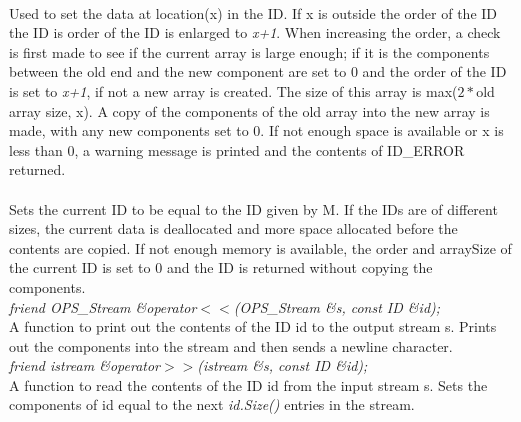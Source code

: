  \\
Used to set the data at location(\p x) in the ID. If \p x is outside
the order of the ID the ID is order of the ID is enlarged to {\em
x+1}. When increasing the order, a check is first made to see if the
current array is large enough; if it is the components between the old
end and the new component are set to $0$ and the order of the ID is set
to {\em x+1}, if not a new array is created. The size of this array is
max($2*$old array size, x). A copy of the components of the old array
into the new array is made, with any new components set to $0$. If not
enough space is available or \p x is less than $0$, a warning
message is printed and the contents of ID\_ERROR returned. \\


\\
Sets the current ID to be equal to the ID given by \p M. If the
IDs are of different sizes, the current data is deallocated and
more space allocated before the contents are copied. If not enough
memory is available, the order and \p arraySize of the current ID
is set to $0$ and the ID is returned without copying the components. \\


{\em friend OPS_Stream \&operator$<<$(OPS_Stream \&s, const ID \&id);} \\
A function to print out the contents of the ID \p id to the output stream
\p s. Prints out the components into the stream and then sends a
newline character. \\

{\em friend istream \&operator$>>$(istream \&s, const ID \&id);} \\
A function to read the contents of the ID \p id from the input
stream \p s. Sets the components of \p id equal to the next {\em
id.Size()} entries in the stream.\\ 






